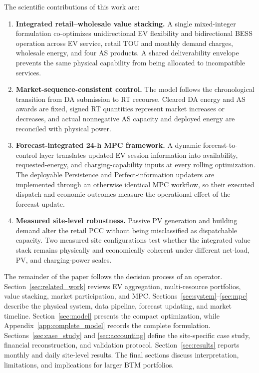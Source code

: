 \documentclass[final,5p,times]{elsarticle}
\begin{document}
The scientific contributions of this work are:
\begin{enumerate}
  \item \textbf{Integrated retail--wholesale value stacking.} A single mixed-integer formulation co-optimizes unidirectional EV flexibility and bidirectional BESS operation across EV service, retail TOU and monthly demand charges, wholesale energy, and four AS products. A shared deliverability envelope prevents the same physical capability from being allocated to incompatible services.
  \item \textbf{Market-sequence-consistent control.} The model follows the chronological transition from DA submission to RT recourse. Cleared DA energy and AS awards are fixed, signed RT quantities represent market increases or decreases, and actual nonnegative AS capacity and deployed energy are reconciled with physical power.
  \item \textbf{Forecast-integrated 24-h MPC framework.} A dynamic forecast-to-control layer translates updated EV session information into availability, requested-energy, and charging-capability inputs at every rolling optimization. The deployable Persistence and Perfect-information updaters are implemented through an otherwise identical MPC workflow, so their executed dispatch and economic outcomes measure the operational effect of the forecast update.
  \item \textbf{Measured site-level robustness.} Passive PV generation and building demand alter the retail PCC without being misclassified as dispatchable capacity. Two measured site configurations test whether the integrated value stack remains physically and economically coherent under different net-load, PV, and charging-power scales.
\end{enumerate}

The remainder of the paper follows the decision process of an operator. Section~\ref{sec:related_work} reviews EV aggregation, multi-resource portfolios, value stacking, market participation, and MPC. Sections~\ref{sec:system}--\ref{sec:mpc} describe the physical system, data pipeline, forecast updating, and market timeline. Section~\ref{sec:model} presents the compact optimization, while Appendix~\ref{app:complete_model} records the complete formulation. Sections~\ref{sec:case_study} and \ref{sec:accounting} define the site-specific case study, financial reconstruction, and validation protocol. Section~\ref{sec:results} reports monthly and daily site-level results. The final sections discuss interpretation, limitations, and implications for larger BTM portfolios.
\end{document}
